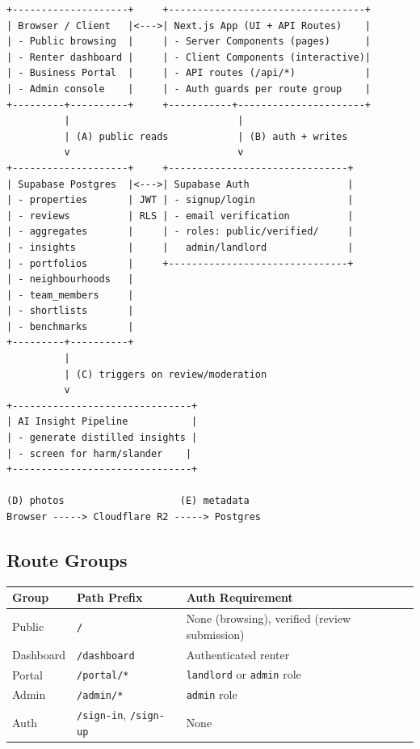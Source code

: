 \documentclass[11pt,letterpaper]{article}
\begin{document}
\begin{verbatim}
+--------------------+     +----------------------------------+
| Browser / Client   |<--->| Next.js App (UI + API Routes)    |
| - Public browsing  |     | - Server Components (pages)      |
| - Renter dashboard |     | - Client Components (interactive)|
| - Business Portal  |     | - API routes (/api/*)            |
| - Admin console    |     | - Auth guards per route group    |
+---------+----------+     +-----------+----------------------+
          |                             |
          | (A) public reads            | (B) auth + writes
          v                             v
+--------------------+     +-------------------------------+
| Supabase Postgres  |<--->| Supabase Auth                 |
| - properties       | JWT | - signup/login                |
| - reviews          | RLS | - email verification          |
| - aggregates       |     | - roles: public/verified/     |
| - insights         |     |   admin/landlord              |
| - portfolios       |     +-------------------------------+
| - neighbourhoods   |
| - team_members     |
| - shortlists       |
| - benchmarks       |
+---------+----------+
          |
          | (C) triggers on review/moderation
          v
+-------------------------------+
| AI Insight Pipeline           |
| - generate distilled insights |
| - screen for harm/slander    |
+-------------------------------+

(D) photos                    (E) metadata
Browser -----> Cloudflare R2 -----> Postgres
\end{verbatim}

\subsection{Route Groups}

\begin{longtable}{l l l}
\toprule
\textbf{Group} & \textbf{Path Prefix} & \textbf{Auth Requirement} \\
\midrule
\endhead
Public     & \texttt{/}           & None (browsing), verified (review submission) \\
Dashboard  & \texttt{/dashboard}  & Authenticated renter \\
Portal     & \texttt{/portal/*}   & \texttt{landlord} or \texttt{admin} role \\
Admin      & \texttt{/admin/*}    & \texttt{admin} role \\
Auth       & \texttt{/sign-in}, \texttt{/sign-up} & None \\
\bottomrule
\end{longtable}
\end{document}
